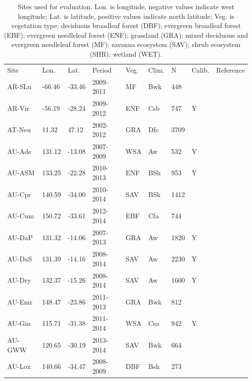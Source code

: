 \documentclass[gmd, manuscript]{copernicus}
\begin{document}
\appendixfigures  %

\appendixtables   %

\begin{table}[t]
\caption{Sites used for evaluation. Lon. is longitude, negative values indicate west longitude; Lat. is latitude, positive values indicate north latitude; Veg. is vegetation type: deciduous broadleaf forest (DBF); evergreen broadleaf forest (EBF); evergreen needleleaf forest (ENF); grassland (GRA); mixed deciduous and evergreen needleleaf forest (MF); savanna ecosystem (SAV); shrub ecosystem (SHR); wetland (WET).} 
\begin{tabular}{lllllllll}
  \tophline
  Site & Lon. & Lat. & Period & Veg. & Clim. & N & Calib. & Reference \\ 
  \middlehline
  AR-SLu & -66.46 & -33.46 & 2009-2011 & MF & Bwk & 448 &  & \citet{AR-SLu} \\ 
  AR-Vir & -56.19 & -28.24 & 2009-2012 & ENF & Csb & 747 & Y & \citet{AR-Vir} \\ 
  AT-Neu & 11.32 & 47.12 & 2002-2012 & GRA & Dfc & 3709 &  & \citet{AT-Neu} \\ 
  AU-Ade & 131.12 & -13.08 & 2007-2009 & WSA & Aw & 532 & Y & \citet{AU-Ade} \\ 
  AU-ASM & 133.25 & -22.28 & 2010-2013 & ENF & BSh & 953 & Y & \citet{AU-ASM} \\ 
  AU-Cpr & 140.59 & -34.00 & 2010-2014 & SAV & BSk & 1412 &  & \citet{AU-Cpr} \\ 
  AU-Cum & 150.72 & -33.61 & 2012-2014 & EBF & Cfa & 744 &  & \citet{AU-XXX} \\ 
  AU-DaP & 131.32 & -14.06 & 2007-2013 & GRA & Aw & 1820 & Y & \citet{AU-DaP} \\ 
  AU-DaS & 131.39 & -14.16 & 2008-2014 & SAV & Aw & 2230 & Y & \citet{AU-DaS} \\ 
  AU-Dry & 132.37 & -15.26 & 2008-2014 & SAV & Aw & 1600 & Y & \citet{AU-Dry} \\ 
  AU-Emr & 148.47 & -23.86 & 2011-2013 & GRA & Bwk & 812 &  & \citet{AU-Emr} \\ 
  AU-Gin & 115.71 & -31.38 & 2011-2014 & WSA & Csa & 942 & Y & \citet{AU-XXX} \\ 
  AU-GWW & 120.65 & -30.19 & 2013-2014 & SAV & Bwk & 664 &  & \citet{AU-GWW} \\ 
  AU-Lox & 140.66 & -34.47 & 2008-2009 & DBF & Bsh & 273 &  & \citet{AU-Lox} \\ 

\end{tabular}
\end{table}
\end{document}
